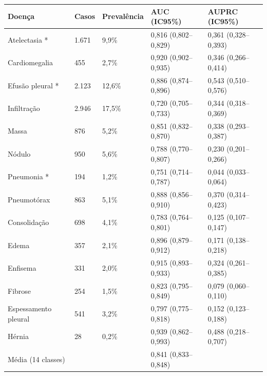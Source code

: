 \begin{tabular}{lllll}
\toprule
Doença & Casos & Prevalência & AUC (IC95\%) & AUPRC (IC95\%) \\
\midrule
Atelectasia * & 1.671 & 9,9\% & 0,816 (0,802–0,829) & 0,361 (0,328–0,393) \\
Cardiomegalia & 455 & 2,7\% & 0,920 (0,902–0,935) & 0,346 (0,266–0,414) \\
Efusão pleural * & 2.123 & 12,6\% & 0,886 (0,874–0,896) & 0,543 (0,510–0,576) \\
Infiltração & 2.946 & 17,5\% & 0,720 (0,705–0,733) & 0,344 (0,318–0,369) \\
Massa & 876 & 5,2\% & 0,851 (0,832–0,870) & 0,338 (0,293–0,387) \\
Nódulo & 950 & 5,6\% & 0,788 (0,770–0,807) & 0,230 (0,201–0,266) \\
Pneumonia * & 194 & 1,2\% & 0,751 (0,714–0,787) & 0,044 (0,033–0,064) \\
Pneumotórax & 863 & 5,1\% & 0,888 (0,856–0,910) & 0,370 (0,314–0,423) \\
Consolidação & 698 & 4,1\% & 0,783 (0,764–0,801) & 0,125 (0,107–0,147) \\
Edema & 357 & 2,1\% & 0,896 (0,879–0,912) & 0,171 (0,138–0,218) \\
Enfisema & 331 & 2,0\% & 0,915 (0,893–0,933) & 0,324 (0,261–0,385) \\
Fibrose & 254 & 1,5\% & 0,823 (0,795–0,849) & 0,079 (0,060–0,110) \\
Espessamento pleural & 541 & 3,2\% & 0,797 (0,775–0,818) & 0,152 (0,123–0,188) \\
Hérnia & 28 & 0,2\% & 0,939 (0,862–0,993) & 0,488 (0,218–0,707) \\
Média (14 classes) &  &  & 0,841 (0,833–0,848) &  \\
\bottomrule
\end{tabular}
